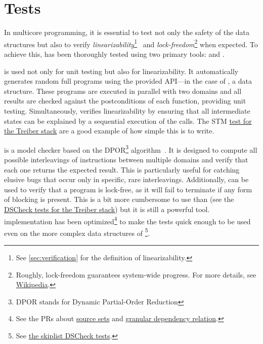 \documentclass[a4paper, 11pt]{article}
\begin{document}
\section{Tests}

In multicore programming, it is essential to test not only the safety of the data structures but also to verify \emph{linearizability}\footnote{See \cref{sec:verification} for the definition of linearizability.}~\cite{DBLP:journals/toplas/HerlihyW90} and \emph{lock-freedom}\footnote{Roughly, lock-freedom guarantees system-wide progress. For more details, see \href{https://en.wikipedia.org/wiki/Non-blocking_algorithm\#Lock-freedom}{Wikipedia}.} when expected.
To achieve this, \Saturn has been thoroughly tested using two primary tools: \DSCheck and \STM.

\STM is used not only for unit testing but also for linearizability.
It automatically generates random full programs using the provided API---in the case of \Saturn, a data structure.
These programs are executed in parallel with two domains and all results are checked against the postconditions of each function, providing unit testing.
Simultaneously, \STM verifies linearizability by ensuring that all intermediate states can be explained by a sequential execution of the calls.
The STM \href{https://github.com/ocaml-multicore/saturn/blob/main/test/treiber_stack/stm_treiber_stack.ml}{test for the Treiber stack} are a good example of how simple this is to write.

\DSCheck is a model checker based on the DPOR\footnote{DPOR stands for Dynamic Partial-Order Reduction} algorithm~\cite{dpor05}.
It is designed to compute all possible interleavings of instructions between multiple domains and verify that each one returns the expected result.
This is particularly useful for catching elusive bugs that occur only in specific, rare interleavings.
Additionally, \DSCheck can be used to verify that a program is lock-free, as it will fail to terminate if any form of blocking is present.
This is a bit more cumbersome to use than \STM (see the \href{https://github.com/ocaml-multicore/saturn/blob/main/test/treiber_stack/treiber_stack_dscheck.ml}{DSCheck tests for the Treiber stack}) but it is still a powerful tool.
\DSCheck implementation has been optimized\footnote{See the PRs about \href{https://github.com/ocaml-multicore/dscheck/pull/18}{source sets} and \href{https://github.com/ocaml-multicore/dscheck/pull/22}{granular dependency relation}.} to make the tests quick enough to be used even on the more complex data structures of \Saturn\footnote{See \href{https://github.com/ocaml-multicore/saturn/blob/main/test/skiplist/stm_skiplist.ml}{the skiplist DSCheck tests}.}.
\end{document}
